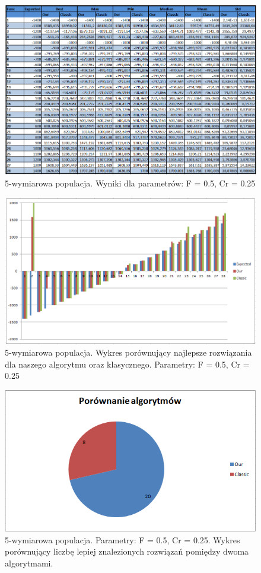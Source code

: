\documentclass[a4paper]{article}
\begin{document}
\begin{figure}[!h]
\centering
\includegraphics[width=\textwidth]{F5Cr25L5tab.png}
\caption{5-wymiarowa populacja. Wyniki dla parametrów: F = 0.5, Cr = 0.25}
\end{figure}

\begin{figure}[!h]
\centering
\includegraphics[width=\textwidth]{F5Cr25L5chart.png}
\caption{5-wymiarowa populacja. Wykres porównujący najlepsze rozwiązania dla naszego algorytmu oraz klasycznego. Parametry: F = 0.5, Cr = 0.25}
\end{figure}

\begin{figure}[!h]
\centering
\includegraphics[width=\textwidth]{F5Cr25L5statystyka.png}
\caption{5-wymiarowa populacja. Parametry: F = 0.5, Cr = 0.25. Wykres porównujący liczbę lepiej znalezionych rozwiązań pomiędzy dwoma algorytmami.}
\end{figure}
\end{document}
